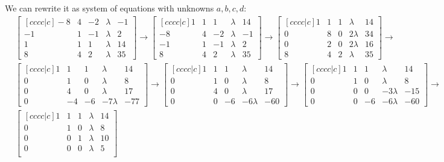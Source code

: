 \documentclass{article}
\begin{document}
\begin{enumerate}
We can rewrite it as system of equations with unknowns $a, b, c, d$:
\begin{align*}
&\begin{bmatrix}[cccc|c]
-8 & 4 & -2 & \lambda & -1\\
-1 & 1 & -1 & \lambda & 2\\
1 & 1 & 1 & \lambda & 14\\
8 & 4 & 2 & \lambda & 35
\end{bmatrix}
\to
\begin{bmatrix}[cccc|c]
1 & 1 & 1 & \lambda & 14\\
-8 & 4 & -2 & \lambda & -1\\
-1 & 1 & -1 & \lambda & 2\\
8 & 4 & 2 & \lambda & 35
\end{bmatrix}
\to
\begin{bmatrix}[cccc|c]
1 & 1 & 1 & \lambda & 14\\
0 & 8 & 0 & 2\lambda & 34\\
0 & 2 & 0 & 2\lambda & 16\\
8 & 4 & 2 & \lambda & 35
\end{bmatrix}
\to\\
&\begin{bmatrix}[cccc|c]
1 & 1 & 1 & \lambda & 14\\
0 & 1 & 0 & \lambda & 8\\
0 & 4 & 0 & \lambda & 17\\
0 & -4 & -6 & -7\lambda & -77
\end{bmatrix}
\to
\begin{bmatrix}[cccc|c]
1 & 1 & 1 & \lambda & 14\\
0 & 1 & 0 & \lambda & 8\\
0 & 4 & 0 & \lambda & 17\\
0 & 0 & -6 & -6\lambda & -60
\end{bmatrix}
\to
\begin{bmatrix}[cccc|c]
1 & 1 & 1 & \lambda & 14\\
0 & 1 & 0 & \lambda & 8\\
0 & 0 & 0 & -3\lambda & -15\\
0 & 0 & -6 & -6\lambda & -60
\end{bmatrix}
\to\\
&\begin{bmatrix}[cccc|c]
1 & 1 & 1 & \lambda & 14\\
0 & 1 & 0 & \lambda & 8\\
0 & 0 & 1 & \lambda & 10\\
0 & 0 & 0 & \lambda & 5\\
\end{bmatrix}
\end{align*}


\end{enumerate}
\end{document}
